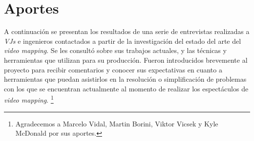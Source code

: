 ﻿\chapter{Aportes}
A continuación se presentan los resultados de una serie de entrevistas realizadas a \emph{VJs} e ingenieros contactados a partir de la investigación del estado del arte del \emph{video mapping}. Se les consultó sobre sus trabajos actuales, y las técnicas y herramientas que utilizan para su producción.
Fueron introducidos brevemente al proyecto para recibir comentarios y conocer sus expectativas en cuanto a herramientas que puedan asistirlos en la resolución o simplificación de problemas con los que se encuentran actualmente al momento de realizar los espectáculos de \emph{video mapping}.
\footnote{Agradecemos a Marcelo Vidal, Martin Borini, Viktor Vicsek y Kyle McDonald por sus aportes.}

